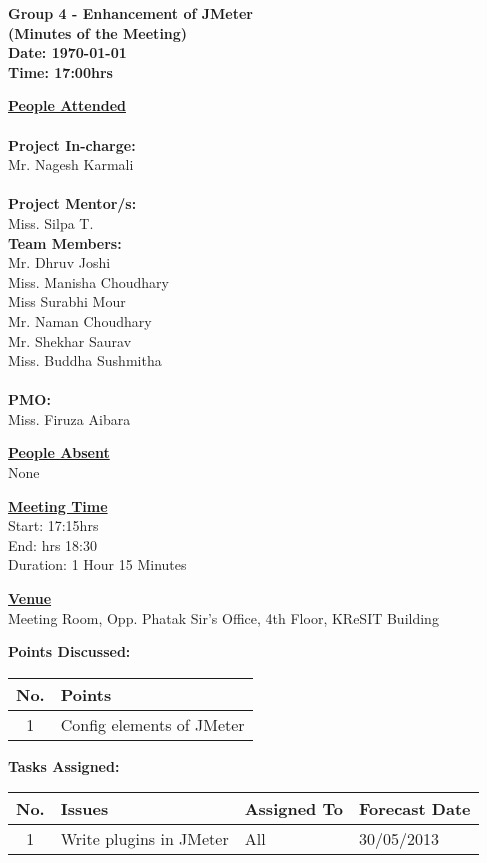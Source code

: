 \documentclass[a4paper,12pt]{article}
\begin{document}
\LARGE
\begin{center}
\textbf
{
Group 4 - Enhancement of JMeter\\
(Minutes of the Meeting) \\ 
Date: \today \\
Time: 17:00hrs
}
\end{center}

\vfill

\large

\underline{\textbf{People Attended}} \\ 
\\
\indent \textbf{Project In-charge:} \\
\indent Mr. Nagesh Karmali \\
\\
\indent \textbf{Project Mentor/s:} \\
\indent Miss. Silpa T.
\\
\indent \textbf{Team Members:} \\
\indent Mr. Dhruv Joshi \\
\indent Miss. Manisha Choudhary \\
\indent Miss Surabhi Mour \\
\indent Mr. Naman Choudhary \\
\indent Mr. Shekhar Saurav \\
\indent Miss. Buddha Sushmitha \\
\\
\indent \textbf{PMO:} \\
\indent Miss. Firuza Aibara\\

\vfill

\underline{\textbf{People Absent}} \\ 
None
\vfill

\underline{\textbf{Meeting Time}} \\
\indent Start: 17:15hrs \\
\indent End: hrs 18:30\\
\indent Duration: 1 Hour 15 Minutes \\

\vfill

\underline{\textbf{Venue}} \\
\indent Meeting Room, Opp. Phatak Sir's Office, 4th Floor, KReSIT Building

\pagebreak

\textbf{Points Discussed:}

\vskip10pt
\begin{tabular}{|c|p{13cm}|}
 \hline
 \textbf{No.} & \textbf{Points} \\
  \hline
  \hline
1 & Config elements of JMeter \\
  \hline
\end{tabular}

\vskip20pt

\textbf{Tasks Assigned:}
\vskip10pt
\begin{tabular}{|c|p{6cm}|p{3cm}|p{4cm}|}
 \hline
 \hline
 \textbf{No.} & \textbf{Issues} & \textbf{Assigned To} & \textbf{Forecast Date} \\
  \hline
  \hline
1 & Write plugins in JMeter & All & 30/05/2013 \\
  \hline
\end{tabular}
\end{document}

